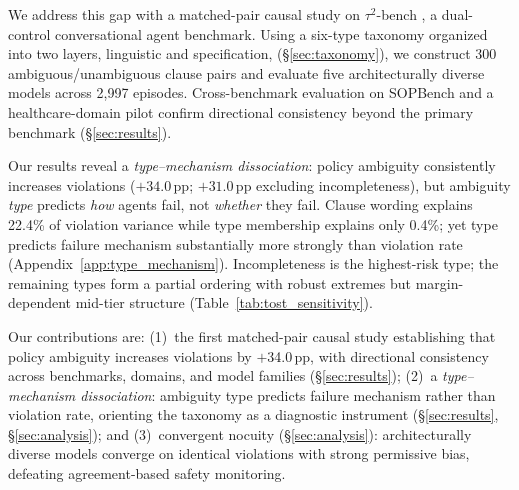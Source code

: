 We address this gap with a matched-pair causal study on $\tau^2$-bench \citep{tau2_bench_2025}, a dual-control conversational agent benchmark. Using a six-type taxonomy organized into two layers, linguistic and specification, (\S\ref{sec:taxonomy}), we construct 300 ambiguous/unambiguous clause pairs and evaluate five architecturally diverse models across 2,997 episodes. Cross-benchmark evaluation on SOPBench and a healthcare-domain pilot confirm directional consistency beyond the primary benchmark (\S\ref{sec:results}).

Our results reveal a \emph{type--mechanism dissociation}: policy ambiguity consistently increases violations ($+34.0$\,pp; $+31.0$\,pp excluding incompleteness), but ambiguity \emph{type} predicts \emph{how} agents fail, not \emph{whether} they fail. Clause wording explains 22.4\% of violation variance while type membership explains only 0.4\%; yet type predicts failure mechanism substantially more strongly than violation rate (Appendix~\ref{app:type_mechanism}). Incompleteness is the highest-risk type; the remaining types form a partial ordering with robust extremes but margin-dependent mid-tier structure (Table~\ref{tab:tost_sensitivity}).

Our contributions are: (1)~the first matched-pair causal study establishing that policy ambiguity increases violations by $+$34.0\,pp, with directional consistency across benchmarks, domains, and model families (\S\ref{sec:results}); (2)~a \emph{type--mechanism dissociation}: ambiguity type predicts failure mechanism rather than violation rate, orienting the taxonomy as a diagnostic instrument (\S\ref{sec:results}, \S\ref{sec:analysis}); and (3)~convergent nocuity (\S\ref{sec:analysis}): architecturally diverse models converge on identical violations with strong permissive bias, defeating agreement-based safety monitoring.
